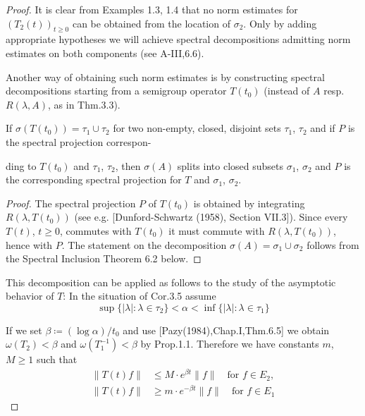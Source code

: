 \begin{proof}
It is clear from Examples 1.3, 1.4 that no norm estimates for $(T_{2}(t))_{t \geq 0}$ can be obtained from the location of $\sigma_{2}$.
Only by adding appropriate hypotheses we will achieve spectral decompositions admitting norm estimates on both components (see A-III,6.6).

Another way of obtaining such norm estimates is by constructing spectral decompositions starting from a semigroup operator $T(t_{0})$ (instead of $A$ resp. $R(\lambda,A)$, as in Thm.3.3).

\begin{corollary}\label{cor:a3-3.5}

If $\sigma(T(t_{0})) = \tau_{1} \cup \tau_{2}$ for two non-empty, closed, disjoint sets $\tau_{1}$, $\tau_{2}$ and if $P$ is the spectral projection correspon-



\newpage
ding to $T(t_{0})$ and $\tau_{1}$, $\tau_{2}$, then $\sigma(A)$ splits into closed subsets $\sigma_{1}$, $\sigma_{2}$ and $P$ is the corresponding spectral projection for $T$ and $\sigma_{1}$, $\sigma_{2}$.
\end{corollary}

\begin{proof}
The spectral projection $P$ of $T(t_{0})$ is obtained by integrating $R(\lambda,T(t_{0}))$ (see e.g. [Dunford-Schwartz (1958), Section VII.3]).
Since every $T(t)$, $t \geq 0$, commutes with $T(t_{0})$ it must commute with $R(\lambda,T(t_{0}))$, hence with $P$.
The statement on the decomposition $\sigma(A) = \sigma_{1} \cup \sigma_{2}$ follows from the Spectral Inclusion Theorem 6.2 below.
\end{proof}

This decomposition can be applied as follows to the study of the asymptotic behavior of $T$: In the situation of Cor.3.5 assume
\[
\sup \{|\lambda| \colon \lambda \in \tau_{2}\} < \alpha < \inf \{|\lambda| \colon \lambda \in \tau_{1}\}
\]

If we set $\beta \coloneqq (\log\alpha)/t_{0}$ and use [Pazy(1984),Chap.I,Thm.6.5] we obtain $\omega(T_{2}) < \beta$ and $\omega(T_{1}^{-1}) < \beta$ by Prop.1.1.
Therefore we have constants $m$, $M \geq 1$ such that
\begin{align*}
\|T(t)f\| &\leq M \cdot e^{\beta t}\|f\| \quad \text{for } f \in E_{2}, \\
\|T(t)f\| &\geq m \cdot e^{-\beta t}\|f\| \quad \text{for } f \in E_{1}
\end{align*}


\end{proof}
